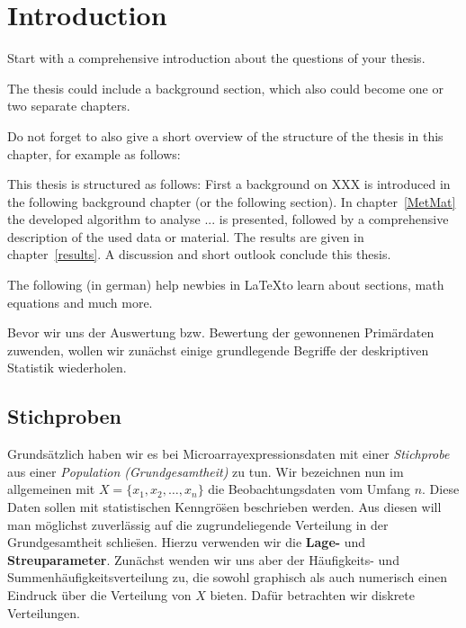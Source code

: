 
\chapter{Introduction}\label{Introduction}

Start with a comprehensive introduction about the questions of your thesis.

The thesis could include a background section, which also could become one or two separate chapters.

Do not forget to also give a short overview of the structure of the thesis in this chapter, for example as follows:

\medskip
This thesis is structured as follows: First a background on XXX is introduced in the following background chapter (or the following section).
In chapter~\ref{MetMat} the developed algorithm to analyse ... is presented, followed by a comprehensive description of the used data or material.
The results are given in chapter~\ref{results}. A discussion and short outlook conclude this thesis.

The following (in german) help newbies in \LaTeX to learn about sections, math equations and much more.

Bevor wir uns der Auswertung bzw. Bewertung der gewonnenen Prim\"ardaten zuwenden, wollen wir zun\"achst einige grundlegende Begriffe der deskriptiven Statistik wiederholen.
\section{Stichproben}

Grunds\"atzlich haben wir es bei Microarrayexpressionsdaten mit einer {\em Stichprobe} aus einer {\em Population (Grundgesamtheit)} zu tun.   
Wir bezeichnen nun im allgemeinen mit $X=\{x_1,x_2,\ldots,x_n\}$ die Beobachtungsdaten vom Umfang $n$. 
Diese Daten sollen mit statistischen Kenngr\"o\"sen beschrieben werden. Aus diesen will man m\"oglichst zuverl\"assig auf die zugrundeliegende Verteilung in der Grundgesamtheit schlie\"sen. Hierzu verwenden wir die {\bf Lage-} und {\bf Streuparameter}. Zun\"achst wenden wir uns aber der H\"aufigkeits- und Summenh\"aufigkeitsverteilung zu, die sowohl graphisch als auch numerisch einen Eindruck \"uber die Verteilung von $X$ bieten. Daf\"ur betrachten wir diskrete Verteilungen.

